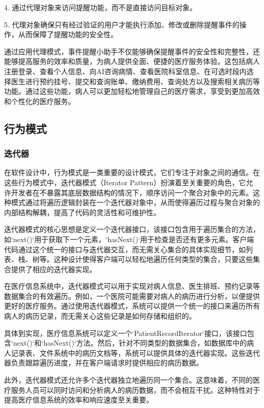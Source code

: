 4. 通过代理对象来访问提醒功能，而不是直接访问目标对象。

5. 代理对象确保只有经过验证的用户才能执行添加、修改或删除提醒事件的操作，从而保障了提醒功能的安全性。


通过应用代理模式，事件提醒小助手不仅能够确保提醒事件的安全性和完整性，还能够提高服务的效率和质量，为病人提供全面、便捷的医疗服务体验。这包括病人注册登录、查看个人信息、向AI咨询病情、查看医院科室信息、在可选时段内选择医生进行预约挂号、提交和查询账单、缴纳费用、查询处方以及搜索相关病历等功能。通过这些功能，病人可以更加轻松地管理自己的医疗需求，享受到更加高效和个性化的医疗服务。

\subsection{行为模式}
\subsubsection{迭代器}
在软件设计中，行为模式是一类重要的设计模式，它们专注于对象之间的通信。在这些行为模式中，迭代器模式（Iterator Pattern）扮演着至关重要的角色，它允许开发者在不暴露其底层数据结构的情况下，顺序访问一个聚合对象中的元素。这种模式通过将遍历逻辑封装在一个迭代器对象中，从而使得遍历过程与聚合对象的内部结构解耦，提高了代码的灵活性和可维护性。

迭代器模式的核心思想是定义一个迭代器接口，该接口包含用于遍历集合的方法，如`next()`用于获取下一个元素，`hasNext()`用于检查是否还有更多元素。客户端代码通过这个统一的接口与迭代器交互，而无需关心集合的具体实现细节，如列表、栈、树等。这种设计使得客户端可以轻松地遍历任何类型的集合，只要这些集合提供了相应的迭代器实现。

在医疗信息系统中，迭代器模式可以用于实现对病人信息、医生排班、预约记录等数据集合的有效遍历。例如，一个医院可能需要对病人的病历进行分析，以便提供更好的医疗服务。通过使用迭代器模式，系统可以提供一个统一的接口来遍历所有病人的病历记录，而无需关心这些记录是如何存储和组织的。

具体到实现，医疗信息系统可以定义一个`PatientRecordIterator`接口，该接口包含`next()`和`hasNext()`方法。然后，针对不同类型的数据集合，如数据库中的病人记录表、文件系统中的病历文档等，系统可以提供具体的迭代器实现。这些迭代器负责跟踪遍历进度，并在客户端请求时提供相应的病历数据。

此外，迭代器模式还允许多个迭代器独立地遍历同一个集合。这意味着，不同的医疗服务人员可以同时访问和分析病人的病历数据，而不会相互干扰。这种特性对于提高医疗信息系统的效率和响应速度至关重要。

